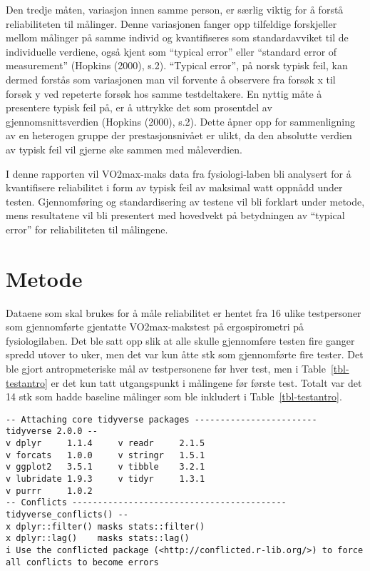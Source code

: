 \documentclass[
  letterpaper,
  DIV=11,
  numbers=noendperiod]{scrreprt}
\begin{document}
Den tredje måten, variasjon innen samme person, er særlig viktig for å
forstå reliabiliteten til målinger. Denne variasjonen fanger opp
tilfeldige forskjeller mellom målinger på samme individ og kvantifiseres
som standardavviket til de individuelle verdiene, også kjent som
``typical error'' eller ``standard error of measurement'' (Hopkins
(2000), s.2). ``Typical error'', på norsk typisk feil, kan dermed
forstås som variasjonen man vil forvente å observere fra forsøk x til
forsøk y ved repeterte forsøk hos samme testdeltakere. En nyttig måte å
presentere typisk feil på, er å uttrykke det som prosentdel av
gjennomsnittsverdien (Hopkins (2000), s.2). Dette åpner opp for
sammenligning av en heterogen gruppe der prestasjonsnivået er ulikt, da
den absolutte verdien av typisk feil vil gjerne øke sammen med
måleverdien.

I denne rapporten vil VO2max-maks data fra fysiologi-laben bli analysert
for å kvantifisere reliabilitet i form av typisk feil av maksimal watt
oppnådd under testen. Gjennomføring og standardisering av testene vil
bli forklart under metode, mens resultatene vil bli presentert med
hovedvekt på betydningen av ``typical error'' for reliabiliteten til
målingene.

\section{Metode}\label{metode}

Dataene som skal brukes for å måle reliabilitet er hentet fra 16 ulike
testpersoner som gjennomførte gjentatte VO2max-makstest på
ergospirometri på fysiologilaben. Det ble satt opp slik at alle skulle
gjennomføre testen fire ganger spredd utover to uker, men det var kun
åtte stk som gjennomførte fire tester. Det ble gjort antropmeteriske mål
av testpersonene før hver test, men i Table~\ref{tbl-testantro} er det
kun tatt utgangspunkt i målingene før første test. Totalt var det 14 stk
som hadde baseline målinger som ble inkludert i
Table~\ref{tbl-testantro}.

\begin{verbatim}
-- Attaching core tidyverse packages ------------------------ tidyverse 2.0.0 --
v dplyr     1.1.4     v readr     2.1.5
v forcats   1.0.0     v stringr   1.5.1
v ggplot2   3.5.1     v tibble    3.2.1
v lubridate 1.9.3     v tidyr     1.3.1
v purrr     1.0.2     
-- Conflicts ------------------------------------------ tidyverse_conflicts() --
x dplyr::filter() masks stats::filter()
x dplyr::lag()    masks stats::lag()
i Use the conflicted package (<http://conflicted.r-lib.org/>) to force all conflicts to become errors
\end{verbatim}
\end{document}
